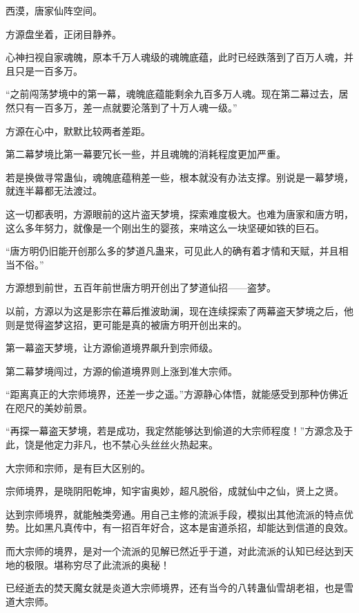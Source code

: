 
\begin{this_body}

西漠，唐家仙阵空间。

方源盘坐着，正闭目静养。

心神扫视自家魂魄，原本千万人魂级的魂魄底蕴，此时已经跌落到了百万人魂，并且只是一百多万。

“之前闯荡梦境中的第一幕，魂魄底蕴能剩余九百多万人魂。现在第二幕过去，居然只有一百多万，差一点就要沦落到了十万人魂一级。”

方源在心中，默默比较两者差距。

第二幕梦境比第一幕要冗长一些，并且魂魄的消耗程度更加严重。

若是换做寻常蛊仙，魂魄底蕴稍差一些，根本就没有办法支撑。别说是一幕梦境，就连半幕都无法渡过。

这一切都表明，方源眼前的这片盗天梦境，探索难度极大。也难为唐家和唐方明，这么多年努力，就像是一个刚出生的婴孩，来啃这么一块坚硬如铁的巨石。

“唐方明仍旧能开创那么多的梦道凡蛊来，可见此人的确有着才情和天赋，并且相当不俗。”

方源想到前世，五百年前世唐方明开创出了梦道仙招——盗梦。

以前，方源以为这是影宗在幕后推波助澜，现在连续探索了两幕盗天梦境之后，他则是觉得盗梦这招，更可能是真的被唐方明开创出来的。

第一幕盗天梦境，让方源偷道境界飙升到宗师级。

第二幕梦境闯过，方源的偷道境界则上涨到准大宗师。

“距离真正的大宗师境界，还差一步之遥。”方源静心体悟，就能感受到那种仿佛近在咫尺的美妙前景。

“再探一幕盗天梦境，若是成功，我定然能够达到偷道的大宗师程度！”方源念及于此，饶是他定力非凡，也不禁心头丝丝火热起来。

大宗师和宗师，是有巨大区别的。

宗师境界，是晓阴阳乾坤，知宇宙奥妙，超凡脱俗，成就仙中之仙，贤上之贤。

达到宗师境界，就能触类旁通。用自己主修的流派手段，模拟出其他流派的特点优势。比如黑凡真传中，有一招百年好合，这本是宙道杀招，却能达到信道的良效。

而大宗师的境界，是对一个流派的见解已然近乎于道，对此流派的认知已经达到天地的极限。堪称穷尽了此流派的奥秘！

已经逝去的焚天魔女就是炎道大宗师境界，还有当今的八转蛊仙雪胡老祖，也是雪道大宗师。


\end{this_body}
